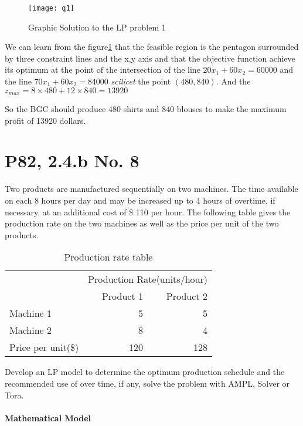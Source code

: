 \documentclass{article}
\numberwithin{equation}{section}
\begin{document}
\begin{figure}[htbp]\caption{Graphic Solution to the LP problem 1}\label{LP1}
	\texttt{[image: q1]}
\end{figure}
	
We can learn from the figure\ref{LP1} that the feasible region is the pentagon surrounded by three constraint lines and the x,y axis and that the objective function achieve its optimum at the point of the intersection of the line $20x_1+60x_2=60000$ and the line $70x_1+60x_2=84000$ \textit{scilicet} the point $(480,840)$. And the $z_{max}=8\times 480+12\times 840=13920$

So the BGC should produce 480 shirts and 840 blouses to make the maximum profit of 13920 dollars.

\section{P82, 2.4.b No. 8}
Two products are manufactured sequentially on two machines. The time available on each 8 hours per day and may be increased up to 4 hours of overtime, if necessary, at an additional cost of \$ 110 per hour. The following table gives the production rate on the two machines as well as the price per unit of the two products.

\begin{table}[htbp]\caption{Production rate table}\label{T2}
	\begin{center}
	\begin{tabular}{@{}lrr@{}}\toprule
		&\multicolumn{2}{c}{Production Rate(units/hour)} \\ \cmidrule{2-3}
		&Product 1 & Product 2\\ \midrule
		Machine 1 & 5 & 5\\
		Machine 2 & 8 & 4\\ \midrule
		Price per unit(\$) & 120 & 128 \\ \bottomrule 
	\end{tabular}
	\end{center}
\end{table}

Develop an LP model to determine the optimum production schedule and the recommended use of over time, if any, solve the problem with AMPL, Solver or Tora.

\paragraph{Mathematical Model}
\end{document}
